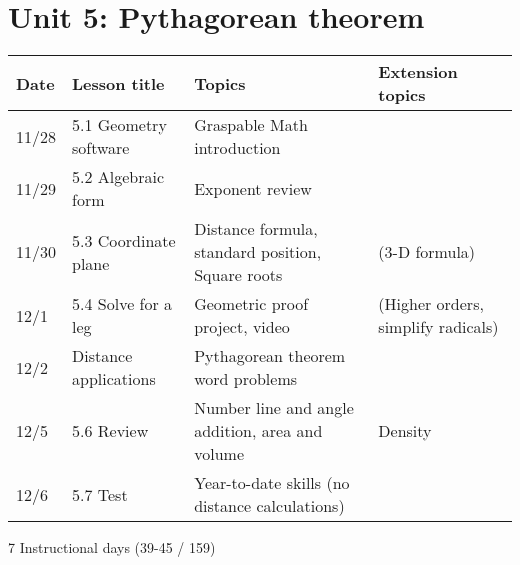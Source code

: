 \documentclass[12pt, twoside]{article}
\begin{document}
\section*{Unit 5: Pythagorean theorem}
\begin{tabular}{|p{0.9cm}|p{4cm}|p{7cm}|p{5cm}|}
  \hline
  Date & Lesson title & Topics  & Extension topics \\
  \hline
  11/28 & 5.1 Geometry software & Graspable Math introduction &  \\
  \hline %
  11/29 & 5.2 Algebraic form & Exponent review &  \\
  \hline %
  11/30 & 5.3 Coordinate plane & Distance formula, standard position, Square roots & (3-D formula) \\
  \hline
  12/1 & 5.4 Solve for a leg & Geometric proof project, video & (Higher orders, simplify radicals) \\
  \hline %
  12/2 & Distance applications & Pythagorean theorem word problems &  \\
  \hline
  12/5 & 5.6 Review & Number line and angle addition, area and volume & Density \\
  \hline
  12/6 & 5.7 Test & Year-to-date skills (no distance calculations) & \\
  \hline %

\end{tabular} \par \vspace*{0.3cm}
7 Instructional days (39-45 / 159)
\end{document}
